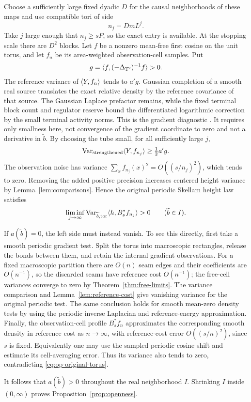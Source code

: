 Choose a sufficiently large fixed dyadic \(D\) for
the causal neighborhoods of these maps and use
compatible tori of side
\begin{equation}\label{eq:op-stopping-tori}
                        n_j=DmL^j .
\end{equation}
Take \(j\) large enough that \(n_j\geq sP\), so
the exact entry is available.  At the stopping
scale there are \(D^2\) blocks.  Let \(f\) be a
nonzero mean-free first cosine on the unit torus,
and let \(f_n\) be its area-weighted observation-cell
samples.  Put
\[
                   g=\langle f,(-\Delta_{\mathbb T^2})^{-1}f\rangle>0.
\]
The reference variance of \(\langle Y,f_n\rangle\) tends
to \(a'g\).  Gaussian completion of a smooth real
source translates the exact relative density by
the reference covariance of that source.  The
Gaussian Laplace prefactor remains, while the
fixed terminal block count and regulator reserve
bound the differentiated logarithmic correction
by the small terminal activity norms.  This is
the gradient diagnostic
.  It requires only
smallness here, not convergence of the gradient
coordinate to zero and not a derivative in
\(\widetilde b\).  By choosing the tube small,
for all sufficiently large \(j\),
\begin{equation}\label{eq:op-positive-torus}
 \operatorname{Var}_{\rm strengthened}\langle Y,f_{n_j}\rangle
                                      \geq \tfrac12 a'g .
\end{equation}
The observation noise has variance
\(\sum_x f_{n_j}(x)^2=O((s/n_j)^2)\), which tends
to zero.  Removing the added positive precision
increases centered height variance by
Lemma~\ref{lem:comparisons}.  Hence the original
periodic Skellam height law satisfies
\begin{equation}\label{eq:op-original-torus}
 \liminf_{j\to\infty}
 \operatorname{Var}_{\widetilde b,{\rm tor}}
             \langle h,B_s^*f_{n_j}\rangle>0
                    \qquad(\widetilde b\in I).
\end{equation}

If \(a(\widetilde b)=0\), the left side must instead
vanish.  To see this directly, first take a smooth
periodic gradient test.  Split the torus into
macroscopic rectangles, release the bonds between
them, and retain the internal gradient observations.
For a fixed macroscopic partition there are \(O(n)\)
seam edges and their coefficients are \(O(n^{-1})\),
so the discarded seams have reference cost \(O(n^{-1})\);
the free-cell variances converge to zero by
Theorem~\ref{thm:free-limits}.  The variance comparison
and Lemma~\ref{lem:reference-cost} give vanishing
variance for the original periodic test.  The
same conclusion holds for smooth mean-zero
density tests by using the periodic inverse
Laplacian and reference-energy approximation.
Finally, the observation-cell profile
\(B_s^*f_n\) approximates the corresponding
smooth density in reference cost as \(n\to\infty\),
with reference-cost error \(O((s/n)^2)\),
since \(s\) is fixed.  Equivalently one may use
the sampled periodic cosine shift and estimate
its cell-averaging error.  Thus its variance
also tends to zero, contradicting
\eqref{eq:op-original-torus}.

It follows that \(a(\widetilde b)>0\) throughout
the real neighborhood \(I\).  Shrinking \(I\)
inside \((0,\infty)\) proves
Proposition~\ref{prop:openness}.
